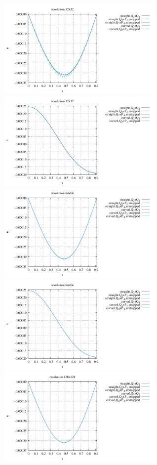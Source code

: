 \newpage
\begin{center}
\includegraphics[width=8cm]{python_codes/fieldstone_25/results/isoviscous/interface_u_32.pdf}
\includegraphics[width=8cm]{python_codes/fieldstone_25/results/isoviscous/interface_v_32.pdf}\\
\includegraphics[width=8cm]{python_codes/fieldstone_25/results/isoviscous/interface_u_64.pdf}
\includegraphics[width=8cm]{python_codes/fieldstone_25/results/isoviscous/interface_v_64.pdf}\\
\includegraphics[width=8cm]{python_codes/fieldstone_25/results/isoviscous/interface_u_128.pdf}

\end{center}
